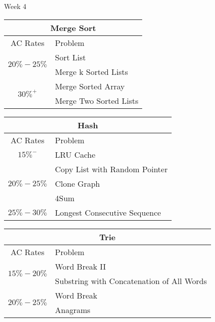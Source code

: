 \documentclass[paper=a4, fontsize=11pt]{scrartcl} %
\begin{document}
\begin{center}
  \pagebreak

  \begin{center}
    Week 4
  \end{center}

  \begin{tabular}{|c|l|}
      \hline
      \multicolumn{2}{|c|}{Merge Sort} \\
      \hline
      AC Rates      &   Problem     \\
      \hline
      \multirow{2}{*}{$20\%-25\%$}  &    Sort List \\
          & Merge k Sorted Lists  \\
      \hline
      \multirow{2}{*}{$30\%^+$}  &    Merge Sorted Array \\
          & Merge Two Sorted Lists \\
      \hline
  \end{tabular}

  \vspace{10mm}

  \begin{tabular}{|c|l|}
      \hline
      \multicolumn{2}{|c|}{Hash} \\
      \hline
      AC Rates      &   Problem     \\
      \hline
      \multirow{1}{*}{$15\%^-$}  &    LRU Cache    \\
      \hline
      \multirow{3}{*}{$20\%-25\%$}  &    Copy List with Random Pointer    \\
          & Clone Graph  \\
          & 4Sum \\
      \hline
      \multirow{1}{*}{$25\%-30\%$}  &    Longest Consecutive Sequence    \\
      \hline
  \end{tabular}

  \vspace{10mm}

  \begin{tabular}{|c|l|}
      \hline
      \multicolumn{2}{|c|}{Trie} \\
      \hline
      AC Rates      &   Problem     \\
      \hline
      \multirow{2}{*}{$15\%-20\%$}  &    Word Break II \\
          & Substring with Concatenation of All Words \\
      \hline
      \multirow{2}{*}{$20\%-25\%$}  &    Word Break \\
          & Anagrams  \\
      \hline
  \end{tabular}


\end{center}
\end{document}
